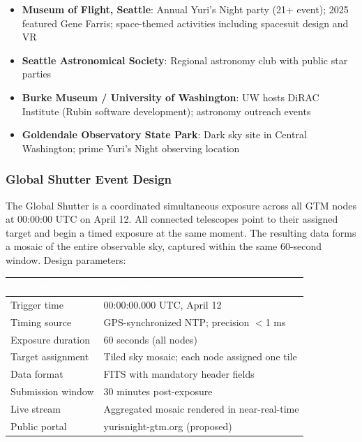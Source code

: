 \documentclass[11pt,letterpaper]{article}
\newcommand{\tableheader}[1]{\textbf{\sffamily\textcolor{white}{#1}}}
\begin{document}
\begin{itemize}
  \item \textbf{Museum of Flight, Seattle}: Annual Yuri's Night party (21+ event); 2025 featured Gene Farris; space-themed activities including spacesuit design and VR
  \item \textbf{Seattle Astronomical Society}: Regional astronomy club with public star parties
  \item \textbf{Burke Museum / University of Washington}: UW hosts DiRAC Institute (Rubin software development); astronomy outreach events
  \item \textbf{Goldendale Observatory State Park}: Dark sky site in Central Washington; prime Yuri's Night observing location
\end{itemize}

\subsubsection{Global Shutter Event Design}

The Global Shutter is a coordinated simultaneous exposure across all GTM nodes at 00:00:00 UTC on April 12. All connected telescopes point to their assigned target and begin a timed exposure at the same moment. The resulting data forms a mosaic of the entire observable sky, captured within the same 60-second window. Design parameters:

\begin{center}
\begin{tabularx}{\textwidth}{L{4cm}X}
\toprule
{}
\tableheader{Parameter} & \tableheader{Value / Specification} \\
\midrule
Trigger time & 00:00:00.000 UTC, April 12 \\
Timing source & GPS-synchronized NTP; precision $<$1 ms \\
Exposure duration & 60 seconds (all nodes) \\
Target assignment & Tiled sky mosaic; each node assigned one tile \\
Data format & FITS with mandatory header fields \\
Submission window & 30 minutes post-exposure \\
Live stream & Aggregated mosaic rendered in near-real-time \\
Public portal & yurisnight-gtm.org (proposed) \\
\bottomrule
\end{tabularx}
\end{center}
\end{document}

